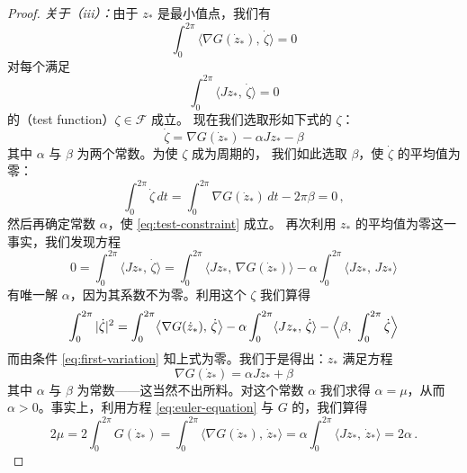 \begin{proof}
\medskip
\noindent\emph{关于（iii）：}由于 $z_{*}$ 是最小值点，我们有
\begin{equation}\label{eq:first-variation}
\int_{0}^{2\pi}\bigl\langle\nabla G(\dot{z}_{*}),\,\dot{\zeta}\bigr\rangle=0
\end{equation}
对每个满足
\begin{equation}\label{eq:test-constraint}
\int_{0}^{2\pi}\langle Jz_{*},\,\dot{\zeta}\rangle=0
\end{equation}
的\textbf{\trTestFunction}（test function）$\zeta\in\mathcal{F}$ 成立。%
现在我们选取形如下式的 $\zeta$：
\[
\dot{\zeta}=\nabla G(\dot{z}_{*})-\alpha Jz_{*}-\beta
\]
其中 $\alpha$ 与 $\beta$ 为两个常数。为使 $\zeta$ 成为周期的，%
我们如此选取 $\beta$，使 $\dot{\zeta}$ 的平均值为零：
\[
\int_{0}^{2\pi}\dot{\zeta}\,dt=\int_{0}^{2\pi}\nabla G(\dot{z}_{*})\,dt-2\pi\beta=0\,,
\]
然后再确定常数 $\alpha$，使 \eqref{eq:test-constraint} 成立。%
再次利用 $z_{*}$ 的平均值为零这一事实，我们发现方程
\begin{equation}\label{eq:alpha-equation}
0=\int_{0}^{2\pi}\langle Jz_{*},\,\dot{\zeta}\rangle
 =\int_{0}^{2\pi}\bigl\langle Jz_{*},\,\nabla G(\dot{z}_{*})\bigr\rangle
 -\alpha\int_{0}^{2\pi}\langle Jz_{*},\,Jz_{*}\rangle
\end{equation}
有唯一解 $\alpha$，因为其系数不为零。利用这个\trTestFunction{} $\zeta$ 我们算得
\[
\int_{0}^{2\pi}|\dot{\zeta}|^{2}
 =\int_{0}^{2\pi}\bigl\langle\nabla G(\dot{z}_{*}),\,\dot{\zeta}\bigr\rangle
 -\alpha\int_{0}^{2\pi}\langle Jz_{*},\,\dot{\zeta}\rangle
 -\Bigl\langle\beta,\ \int_{0}^{2\pi}\dot{\zeta}\Bigr\rangle
\]
而由条件 \eqref{eq:first-variation} 知上式为零。我们于是得出：$z_{*}$ 满足\trEuler{}方程
\begin{equation}\label{eq:euler-equation}
\nabla G(\dot{z}_{*})=\alpha Jz_{*}+\beta
\end{equation}
其中 $\alpha$ 与 $\beta$ 为常数——这当然不出所料。对这个常数 $\alpha$%
我们求得 $\alpha=\mu$，从而 $\alpha>0$。事实上，利用\trEuler{}方程%
\eqref{eq:euler-equation} 与 $G$ 的\trHomogeneity，我们算得
\[
2\mu=2\int_{0}^{2\pi}G(\dot{z}_{*})
 =\int_{0}^{2\pi}\bigl\langle\nabla G(\dot{z}_{*}),\,\dot{z}_{*}\bigr\rangle
 =\alpha\int_{0}^{2\pi}\langle Jz_{*},\,\dot{z}_{*}\rangle=2\alpha\,.
\]


\end{proof}
